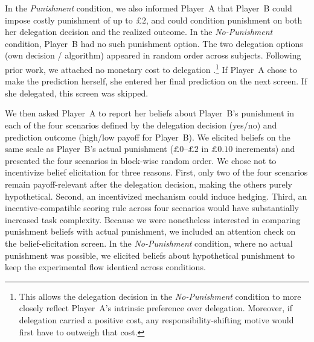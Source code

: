 In the \textit{Punishment} condition, we also informed Player~A that Player~B could impose costly punishment of up to $\pounds 2$, and could condition punishment on both her delegation decision and the realized outcome. In the \textit{No-Punishment} condition, Player~B had no such punishment option. The two delegation options (own decision / algorithm) appeared in random order across subjects. Following prior work, we attached no monetary cost to delegation \citep{bartling_shifting_2012,coffman_intermediation_2011,feier_hiding_2022}.\footnote{This allows the delegation decision in the \textit{No-Punishment} condition to more closely reflect Player~A's intrinsic preference over delegation. Moreover, if delegation carried a positive cost, any responsibility-shifting motive would first have to outweigh that cost.}
If Player~A chose to make the prediction herself, she entered her final prediction on the next screen. If she delegated, this screen was skipped.

We then asked Player~A to report her beliefs about Player~B's punishment in each of the four scenarios defined by the delegation decision (yes/no) and prediction outcome (high/low payoff for Player~B). We elicited beliefs on the same scale as Player~B's actual punishment ($\pounds 0$--$\pounds 2$ in $\pounds 0.10$ increments) and presented the four scenarios in block-wise random order. We chose not to incentivize belief elicitation for three reasons. First, only two of the four scenarios remain payoff-relevant after the delegation decision, making the others purely hypothetical. Second, an incentivized mechanism could induce hedging. Third, an incentive-compatible scoring rule across four scenarios would have substantially increased task complexity. Because we were nonetheless interested in comparing punishment beliefs with actual punishment, we included an attention check on the belief-elicitation screen. In the \textit{No-Punishment} condition, where no actual punishment was possible, we elicited beliefs about hypothetical punishment to keep the experimental flow identical across conditions.

